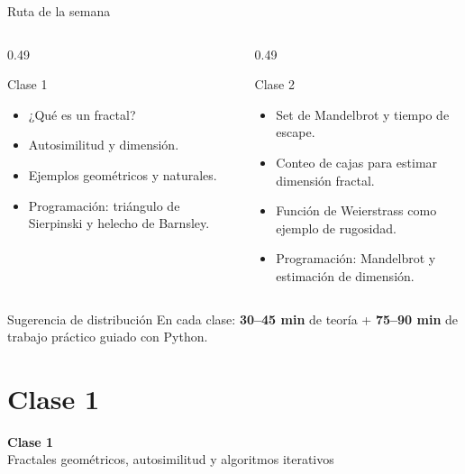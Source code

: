 




\frame{\titlepage}

\begin{frame}{Ruta de la semana}
\begin{columns}[T]
\begin{column}{0.49\textwidth}
\begin{block}{Clase 1}
\begin{itemize}
    \item ¿Qué es un fractal?
    \item Autosimilitud y dimensión.
    \item Ejemplos geométricos y naturales.
    \item Programación: triángulo de Sierpinski y helecho de Barnsley.
\end{itemize}
\end{block}
\end{column}
\begin{column}{0.49\textwidth}
\begin{block}{Clase 2}
\begin{itemize}
    \item Set de Mandelbrot y tiempo de escape.
    \item Conteo de cajas para estimar dimensión fractal.
    \item Función de Weierstrass como ejemplo de rugosidad.
    \item Programación: Mandelbrot y estimación de dimensión.
\end{itemize}
\end{block}
\end{column}
\end{columns}

\vspace{0.4cm}
\begin{alertblock}{Sugerencia de distribución}
En cada clase: \textbf{30--45 min} de teoría + \textbf{75--90 min} de trabajo práctico guiado con Python.
\end{alertblock}
\end{frame}

\section{Clase 1}

\begin{frame}[plain]
\centering
\vfill
{\Huge \bfseries Clase 1}\\[0.4cm]
{\Large Fractales geométricos, autosimilitud y algoritmos iterativos}
\vfill
\end{frame}

